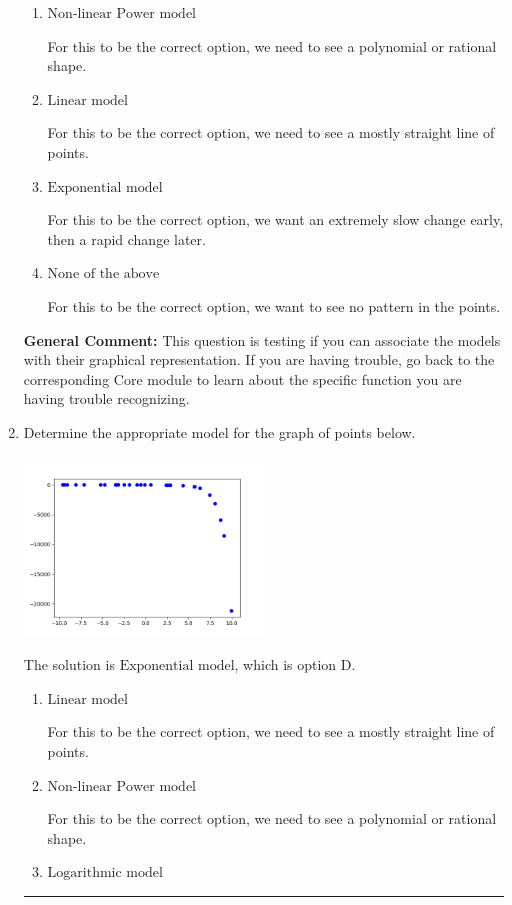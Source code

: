 \documentclass{extbook}[14pt]
\newcommand{\litem}[1]{\item #1

\rule{\textwidth}{0.4pt}}
\begin{document}
\begin{enumerate}
{\begin{enumerate}[label=\Alph*.]
For this to be the correct option, we want a rapid change early, then an extremely slow change later.
\item \( \text{Non-linear Power model} \)

For this to be the correct option, we need to see a polynomial or rational shape.
\item \( \text{Linear model} \)

For this to be the correct option, we need to see a mostly straight line of points.
\item \( \text{Exponential model} \)

For this to be the correct option, we want an extremely slow change early, then a rapid change later.
\item \( \text{None of the above} \)

For this to be the correct option, we want to see no pattern in the points.
\end{enumerate}

\textbf{General Comment:} This question is testing if you can associate the models with their graphical representation. If you are having trouble, go back to the corresponding Core module to learn about the specific function you are having trouble recognizing.
}
\litem{
Determine the appropriate model for the graph of points below.

\begin{center}
    \includegraphics[width=0.5\textwidth]{../Figures/identifyModelGraph12B.png}
\end{center}


The solution is \( \text{Exponential model} \), which is option D.\begin{enumerate}[label=\Alph*.]
\item \( \text{Linear model} \)

For this to be the correct option, we need to see a mostly straight line of points.
\item \( \text{Non-linear Power model} \)

For this to be the correct option, we need to see a polynomial or rational shape.
\item \( \text{Logarithmic model} \)


\end{enumerate}}
\end{enumerate}
\end{document}
